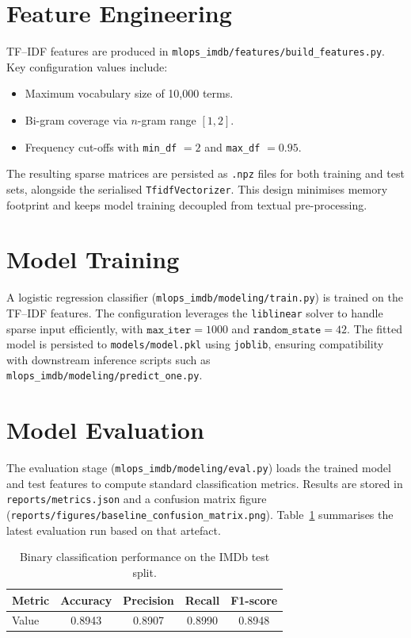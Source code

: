\documentclass[11pt,a4paper]{article}
\begin{document}
\section{Feature Engineering}
TF--IDF features are produced in \texttt{mlops\_imdb/features/build\_features.py}. Key configuration values include:
\begin{itemize}[leftmargin=*]
  \item Maximum vocabulary size of 10{,}000 terms.
  \item Bi-gram coverage via \(n\)-gram range \([1, 2]\).
  \item Frequency cut-offs with \texttt{min\_df} \(=2\) and \texttt{max\_df} \(=0.95\).
\end{itemize}
The resulting sparse matrices are persisted as \texttt{.npz} files for both training and test sets, alongside the serialised \texttt{TfidfVectorizer}. This design minimises memory footprint and keeps model training decoupled from textual pre-processing.

\section{Model Training}
A logistic regression classifier (\texttt{mlops\_imdb/modeling/train.py}) is trained on the TF--IDF features. The configuration leverages the \texttt{liblinear} solver to handle sparse input efficiently, with \( \texttt{max\_iter} = 1000 \) and \( \texttt{random\_state} = 42 \). The fitted model is persisted to \texttt{models/model.pkl} using \texttt{joblib}, ensuring compatibility with downstream inference scripts such as \texttt{mlops\_imdb/modeling/predict\_one.py}.

\section{Model Evaluation}
The evaluation stage (\texttt{mlops\_imdb/modeling/eval.py}) loads the trained model and test features to compute standard classification metrics. Results are stored in \texttt{reports/metrics.json} and a confusion matrix figure (\texttt{reports/figures/baseline\_confusion\_matrix.png}). Table~\ref{tab:metrics} summarises the latest evaluation run based on that artefact.

\begin{table}[h]
  \centering
  \caption{Binary classification performance on the IMDb test split.}
  \label{tab:metrics}
  \begin{tabular}{lcccc}
    \toprule
    Metric & Accuracy & Precision & Recall & F1-score \\
    \midrule
    Value & 0.8943 & 0.8907 & 0.8990 & 0.8948 \\
    \bottomrule
  \end{tabular}
\end{table}
\end{document}
